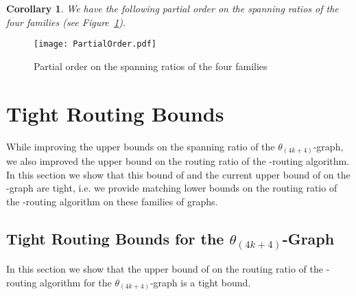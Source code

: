 \documentclass[12pt]{article}
\newtheorem{coro}[defin]{Corollary}
\newenvironment{corollary}{\begin{coro} \sl}{\end{coro}}
\newcommand{\Graph}[1]{\ensuremath{\theta_{(4 k + #1)}}-Graph\xspace}
\newcommand{\graph}[1]{\ensuremath{\theta_{(4 k + #1)}}-graph\xspace}
\begin{document}
\begin{corollary}
  We have the following partial order on the spanning ratios of the four families (see Figure~\ref{figure partial order}).
\end{corollary}

\begin{figure}[ht]
  \centering
  \texttt{[image: PartialOrder.pdf]}
  \caption{Partial order on the spanning ratios of the four families}
  \label{figure partial order}
\end{figure}


\section{Tight Routing Bounds}
While improving the upper bounds on the spanning ratio of the \graph{4}, we also improved the upper bound on the routing ratio of the -routing algorithm. In this section we show that this bound of  and the current upper bound of  on the -graph are tight, i.e. we provide matching lower bounds on the routing ratio of the -routing algorithm on these families of graphs. 


\subsection{Tight Routing Bounds for the \Graph{4}}
In this section we show that the upper bound of  on the routing ratio of the -routing algorithm for the \graph{4} is a tight bound. 
\end{document}
